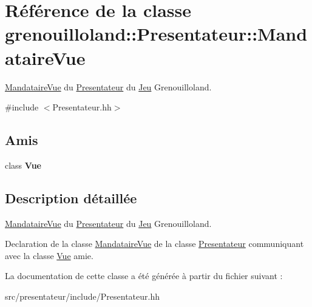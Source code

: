\hypertarget{classgrenouilloland_1_1Presentateur_1_1MandataireVue}{\section{Référence de la classe grenouilloland\-:\-:Presentateur\-:\-:Mandataire\-Vue}
\label{classgrenouilloland_1_1Presentateur_1_1MandataireVue}
}


\hyperlink{classgrenouilloland_1_1Presentateur_1_1MandataireVue}{Mandataire\-Vue} du \hyperlink{classgrenouilloland_1_1Presentateur}{Presentateur} du \hyperlink{classgrenouilloland_1_1Jeu}{Jeu} Grenouilloland.  




{\ttfamily \#include $<$Presentateur.\-hh$>$}

\subsection*{Amis}
\begin{DoxyCompactItemize}
\item 
\hypertarget{classgrenouilloland_1_1Presentateur_1_1MandataireVue_adc3b1810b8d3988a7832f57c330fe4fd}{class {\bfseries Vue}}\label{classgrenouilloland_1_1Presentateur_1_1MandataireVue_adc3b1810b8d3988a7832f57c330fe4fd}

\end{DoxyCompactItemize}


\subsection{Description détaillée}
\hyperlink{classgrenouilloland_1_1Presentateur_1_1MandataireVue}{Mandataire\-Vue} du \hyperlink{classgrenouilloland_1_1Presentateur}{Presentateur} du \hyperlink{classgrenouilloland_1_1Jeu}{Jeu} Grenouilloland. 

Declaration de la classe \hyperlink{classgrenouilloland_1_1Presentateur_1_1MandataireVue}{Mandataire\-Vue} de la classe \hyperlink{classgrenouilloland_1_1Presentateur}{Presentateur} communiquant avec la classe \hyperlink{classgrenouilloland_1_1Vue}{Vue} amie. 

La documentation de cette classe a été générée à partir du fichier suivant \-:\begin{DoxyCompactItemize}
\item 
src/presentateur/include/Presentateur.\-hh\end{DoxyCompactItemize}

